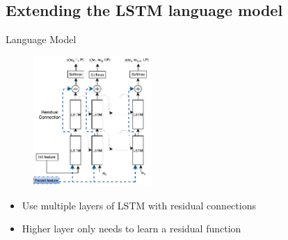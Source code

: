 \documentclass{beamer}
\begin{document}
\subsection{Extending the LSTM language model}
\begin{frame}{Language Model}
    \begin{figure}[h]
        \centering
        \includegraphics[width=0.4\textwidth]{images/MultilayerResidualLSTM.pdf}
    \end{figure}
    \begin{itemize}
        \item Use multiple layers of LSTM with residual connections~\cite{He2015} 
        \item Higher layer only needs to learn a residual function 
    \end{itemize}
\end{frame}
\end{document}
